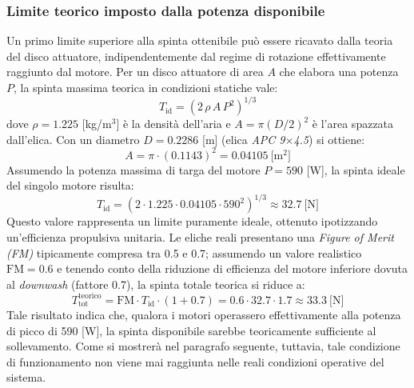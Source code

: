 \documentclass[11pt]{report}
\begin{document}
	\subsubsection*{Limite teorico imposto dalla potenza disponibile}
	Un primo limite superiore alla spinta ottenibile può essere ricavato dalla teoria del disco attuatore, indipendentemente dal regime di rotazione effettivamente raggiunto dal motore. Per un disco attuatore di area $A$ che elabora una potenza $P$, la spinta massima teorica in condizioni statiche vale:
	\begin{equation}
		T_\text{id} = \left( 2 \, \rho \, A \, P^2 \right)^{1/3}
		\label{eq:disco_attuatore}
	\end{equation}
	dove $\rho = 1.225$ [kg/m$^3$] è la densità dell'aria e $A = \pi (D/2)^2$ è l'area spazzata dall'elica. Con un diametro $D = 0.2286$ [m] (elica \textit{APC 9$\times$4.5}) si ottiene:
	\begin{equation}
		A = \pi \cdot (0.1143)^2 = 0.04105\ \text{[m$^2$]}
		\label{eq:area_elica}
	\end{equation}
	Assumendo la potenza massima di targa del motore $P = 590$ [W], la spinta ideale del singolo motore risulta:
	\begin{equation}
		T_\text{id} = \left( 2 \cdot 1.225 \cdot 0.04105 \cdot 590^2 \right)^{1/3} \approx 32.7\ \text{[N]}
		\label{eq:spinta_ideale}
	\end{equation}
	Questo valore rappresenta un limite puramente ideale, ottenuto ipotizzando un'efficienza propulsiva unitaria. Le eliche reali presentano una \textit{Figure of Merit (FM)} tipicamente compresa tra 0.5 e 0.7; assumendo un valore realistico $\text{FM} = 0.6$ e tenendo conto della riduzione di efficienza del motore inferiore dovuta al \textit{downwash} (fattore 0.7), la spinta totale teorica si riduce a:
	\begin{equation}
		T_\text{tot}^\text{teorico} = \text{FM} \cdot T_\text{id} \cdot (1 + 0.7) = 0.6 \cdot 32.7 \cdot 1.7 \approx 33.3\ \text{[N]}
		\label{eq:spinta_teorica}
	\end{equation}
	Tale risultato indica che, qualora i motori operassero effettivamente alla potenza di picco di 590 [W], la spinta disponibile sarebbe teoricamente sufficiente al sollevamento. Come si mostrerà nel paragrafo seguente, tuttavia, tale condizione di funzionamento non viene mai raggiunta nelle reali condizioni operative del sistema.
	
\end{document}
